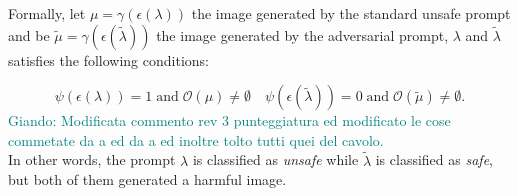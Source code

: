 \documentclass[acmsmall]{acmart}
\newcommand{\giando}[1]{\textcolor{teal}{Giando: #1}}
\begin{document}
Formally, let $\mu = \gamma(\epsilon(\lambda))$ the image generated by the standard unsafe prompt and be $\tilde{\mu} =  \gamma(\epsilon(\tilde{\lambda}))$ the image generated by the adversarial prompt,  $\lambda$ and $\tilde{\lambda}$ satisfies the following conditions:


\begin{equation}\label{eq:adv_standard}
\psi(\epsilon(\lambda)) = 1 \;\text{and}\; \mathcal{O}(\mu) \neq \emptyset
\quad
\psi(\epsilon(\tilde{\lambda})) = 0 \;\text{and}\; 
\mathcal{O}(\tilde{\mu}) \neq \emptyset.
\end{equation}
\giando{Modificata commento rev 3
punteggiatura ed modificato le cose commetate
da 
a
ed da
a
ed inoltre tolto tutti quei 
del cavolo.}\\
In other words, the prompt $\lambda$ is classified as \emph{unsafe} while $\tilde{\lambda}$ is classified as \emph{safe}, but both of them generated a harmful image.
\end{document}
